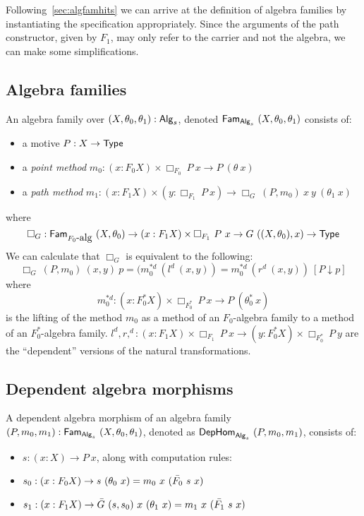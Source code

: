 \documentclass[a4paper,10pt]{report}
\begin{document}
Following~\cref{sec:algfamhits} we can arrive at the definition of
algebra families by instantiating the specification
appropriately. Since the arguments of the path constructor, given by
$F_1$, may only refer to the carrier and not the algebra, we can make
some simplifications.

\subsection{Algebra families}

\begin{defn}
  An algebra family over $(X,\theta_0,\theta_1) : \mathsf{Alg}_s$, denoted
  $\mathsf{Fam}_{\mathsf{Alg}_s}\ (X,\theta_0,\theta_1)$ consists of:

  \begin{itemize}
  \item a motive $P : X \to \mathsf{Type}$
  \item a \emph{point method} $m_0 : (x : F_0 X) \times \Box_{F_0}\  P\ x \to P\ (\theta\ x)$
  \item a \emph{path method} $m_1 : (x : F_1 X) \times (y : \Box_{F_1}\ P\ x) \to \Box_G\ (P,m_0)\ x\ y\ (\theta_1\ x)$
  \end{itemize}
\end{defn}
where
$$
\Box_G : \famover{\algcat{F_0}}{(X,\theta_0)} \to (x : F_1 X) \times \Box_{F_1}\ P\ x \to G\ ((X,\theta_0),x) \to \Type
$$
We can calculate that $\Box_G$ is equivalent to the following:
$$
\Box_G\ (P,m_0)\ (x, y)\ p = (m_0^{*d}\ (l^d\ (x , y)) = m_0^{*d}\ (r^d\ (x , y))\ [ P \downarrow p ]
$$
where
$$
m_0^{*d} : (x : F_0^* X) \times \Box_{F_0^*}\ P\ x \to P\ (\theta_0^*\ x)
$$
is the lifting of the method $m_0$ as a method of an $F_0$-algebra
family to a method of an $F_0^*$-algebra family.
$l^d, r,^d : (x : F_1 X) \times \Box_{F_1}\ P\ x \to (y : F_0^* X)
\times \Box_{F_0^*}\ P\ y$
are the ``dependent'' versions of the natural transformations.


\subsection{Dependent algebra morphisms}

\begin{defn}
  A dependent algebra morphism of an algebra family
  $(P,m_0,m_1) : \mathsf{Fam}_{\mathsf{Alg}_s}\ (X,\theta_0,\theta_1)$, denoted as
  $\mathsf{DepHom}_{\mathsf{Alg}_s}\ (P,m_0,m_1)$, consists of:

  \begin{itemize}
  \item $s : (x : X) \to P\ x$, along with computation rules:
  \item $s_0 : (x : F_0 X) \to s\ (\theta_0\ x) = m_0\ x\ (\bar{F_0}\ s\ x)$
  \item $s_1 : (x : F_1 X) \to \actionsection{G}\ (s,s_0)\ x\ (\theta_1\ x) = m_1\ x\ (\actionsection{F_1}\ s\ x)$
  \end{itemize}
\end{defn}
\end{document}
